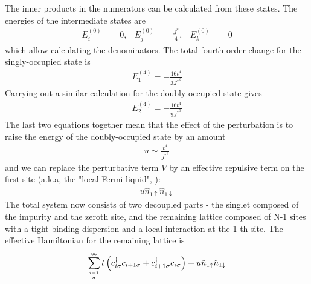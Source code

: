 \documentclass[12pt,twoside]{report}
\numberwithin{equation}{section}
\begin{document}
The inner products in the numerators can be calculated from these states. The energies of the intermediate states are
\begin{equation}\begin{aligned}
	E^{(0)}_i &=0, &E^{(0)}_j &= \frac{J^*}{4}, &E^{(0)}_k &= 0
\end{aligned}\end{equation}
which allow calculating the denominators. The total fourth order change for the singly-occupied state is
\begin{equation}\begin{aligned}
E_1^{(4)} = -\frac{16t^4}{3{J^*}^3}
\end{aligned}\end{equation}
Carrying out a similar calculation for the doubly-occupied state gives
\begin{equation}\begin{aligned}
	E_2^{(4)} = -\frac{16t^4}{9{J^*}^3}
\end{aligned}\end{equation}
The last two equations together mean that the effect of the perturbation is to raise the energy of the doubly-occupied state by an amount
\begin{equation}\begin{aligned}
	u \sim \frac{t^4}{{J^*}^3}
\end{aligned}\end{equation}
and we can replace the perturbative term \(V\) by an effective repulsive term on the first site (a.k.a, the "local Fermi liquid", \cite{nozieres}):
\begin{equation}\begin{aligned}
	u\hat n_{1 \uparrow}\hat n_{1 \downarrow}
\end{aligned}\end{equation}
The total system now consists of two decoupled parts - the singlet composed of the impurity and the zeroth site, and the remaining lattice composed of N-1 sites with a tight-binding dispersion and a local interaction at the 1-th site. The effective Hamiltonian for the remaining lattice is
\begin{equation}\begin{aligned}
	\sum_{i=1\atop{\sigma}}^\infty t\left(c^\dagger_{i\sigma}c_{i+1 \sigma} + c^\dagger_{i+1 \sigma}c_{i\sigma}\right) + u \hat n_{1 \uparrow} \hat n_{1 \downarrow}
\end{aligned}\end{equation}
\end{document}
